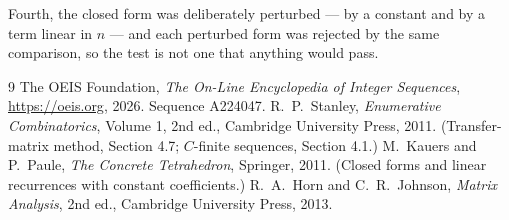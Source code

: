 \documentclass[11pt,a4paper]{article}
\theoremstyle{plain}
\theoremstyle{definition}
\begin{document}
Fourth, the closed form was deliberately perturbed --- by a constant and by a term linear in
$n$ --- and each perturbed form was rejected by the same comparison, so the test is not one
that anything would pass.

\begin{thebibliography}{9}
 The OEIS Foundation, \emph{The On-Line Encyclopedia of Integer
Sequences}, \url{https://oeis.org}, 2026. Sequence A224047.
 R.~P.~Stanley, \emph{Enumerative Combinatorics}, Volume 1, 2nd ed.,
Cambridge University Press, 2011. (Transfer-matrix method, Section 4.7; $C$-finite sequences,
Section 4.1.)
 M.~Kauers and P.~Paule, \emph{The Concrete Tetrahedron}, Springer, 2011.
(Closed forms and linear recurrences with constant coefficients.)
 R.~A.~Horn and C.~R.~Johnson, \emph{Matrix Analysis}, 2nd ed., Cambridge
University Press, 2013.
\end{thebibliography}
\end{document}
